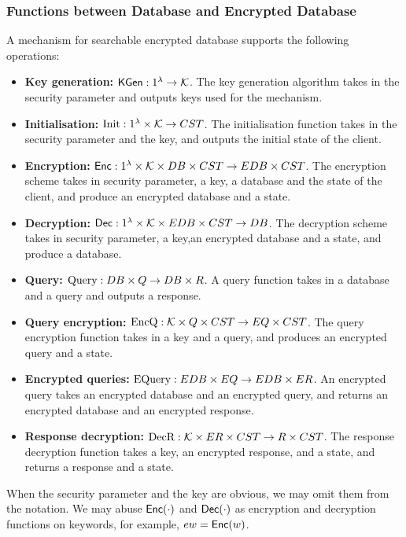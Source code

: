 \subsubsection{Functions between Database and Encrypted Database}
A mechanism for searchable encrypted database supports the following operations:
\begin{itemize}
	\item \textbf{Key generation:} $\mathsf{KGen}: 1^{\lambda} \rightarrow \mathcal{K}$. The key generation algorithm takes in the security parameter and outputs keys used for the mechanism.
	
	\item \textbf{Initialisation:} $\text{Init}: 1^{\lambda} \times \mathcal{K} \rightarrow CST$. The initialisation function takes in the security parameter and the key, and outputs the initial state of the client.
	
	\item \textbf{Encryption:} $\mathsf{Enc}: 1^{\lambda} \times \mathcal{K} \times DB \times CST \rightarrow EDB \times CST$. The encryption scheme takes in security parameter, a key, a database and the state of the client, and produce an encrypted database and a state.
	
	\item \textbf{Decryption:} $\mathsf{Dec}: 1^{\lambda} \times \mathcal{K} \times EDB \times CST \rightarrow DB$. The decryption scheme takes in security parameter, a key,an encrypted database and a state, and produce a database.
	
	\item \textbf{Query:} $\text{Query}: DB \times Q \rightarrow DB \times R$. A query function takes in a database and a query and outputs a response.
	
	\item \textbf{Query encryption:} $\text{EncQ}: \mathcal{K} \times Q \times CST \rightarrow EQ \times CST$. The query encryption function takes in a key and a query, and produces an encrypted query and a state.
	
	\item \textbf{Encrypted queries:} $\text{EQuery}:EDB \times EQ \rightarrow EDB \times ER$. An encrypted query takes an encrypted database and an encrypted query, and returns an encrypted database and an encrypted response.
	
	\item \textbf{Response decryption:} $\text{DecR}: \mathcal{K} \times ER \times CST \rightarrow R \times CST$. The response decryption function takes a key, an encrypted response, and a state, and returns a response and a state.
\end{itemize}
When the security parameter and the key are obvious, we may omit them from the notation. We may abuse $\mathsf{Enc}(\cdot)$ and $\mathsf{Dec}(\cdot)$ as encryption and decryption functions on keywords, for example, $ew = \mathsf{Enc}(w)$.


